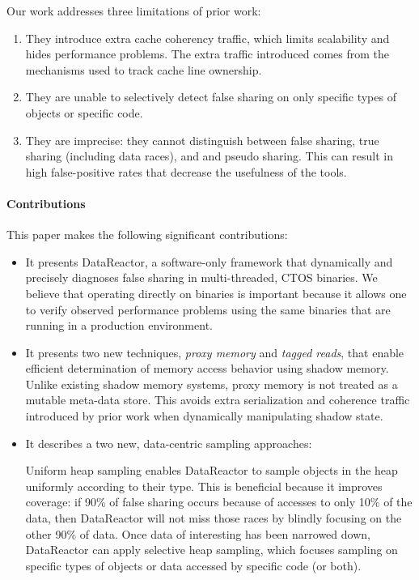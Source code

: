 \documentclass{sig-alternate}
\newcommand{\Toolname}{DataReactor}
\begin{document}
Our work addresses three limitations of prior work:
\begin{enumerate}
\item They introduce extra cache coherency traffic, which limits scalability and hides performance
problems. The extra traffic introduced comes from the mechanisms used to track cache line ownership.

\item They are unable to selectively detect false sharing on only specific types of objects or specific
code.

\item They are imprecise: they cannot distinguish between false sharing, true sharing (including
data races), and and pseudo sharing. This can result in high false-positive rates that decrease the
usefulness of the tools.

\end{enumerate}

\paragraph{Contributions}
This paper makes the following significant contributions:
\begin{itemize}
\item It presents \Toolname{}, a software-only framework that dynamically and precisely diagnoses
false sharing  in multi-threaded, CTOS binaries. We believe that operating directly on binaries is
important because it allows one to verify observed performance problems using the same binaries
that are running in a production environment.

\item It presents two new techniques, \emph{proxy memory} and \emph{tagged reads}, that enable
efficient determination of memory access behavior using shadow memory. Unlike existing shadow
memory systems, proxy memory is not treated as a mutable meta-data store. This avoids extra
serialization and coherence traffic introduced by prior work when dynamically manipulating shadow state.

\item It describes a two new, data-centric sampling approaches:  Uniform heap sampling enables \Toolname{} to sample objects in the heap uniformly
according to their type. This is beneficial because it improves coverage: if 90\% of false sharing occurs because
of accesses to only 10\% of the data, then \Toolname{} will not miss those races by blindly focusing on the
other 90\% of data. Once data of interesting has been narrowed down, \Toolname{} can apply selective heap
sampling, which focuses sampling on specific types of objects or data accessed by specific code (or both).
\end{itemize}
\end{document}
